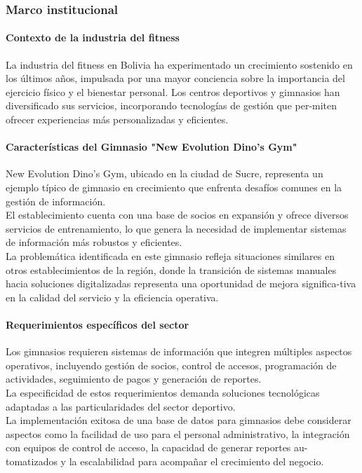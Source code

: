 \documentclass[12pt, letterpaper]{article}
\begin{document}
\subsubsection{Marco institucional}
\paragraph{\textbf{Contexto de la industria del fitness}}
La industria del fitness en Bolivia ha experimentado un crecimiento sostenido en los últimos años, impulsada por una mayor conciencia sobre la importancia del ejercicio físico y el bienestar personal. Los centros deportivos y gimnasios han diversificado sus servicios, incorporando tecnologías de gestión que per-miten ofrecer experiencias más personalizadas y eficientes.
\paragraph{\textbf{Características del Gimnasio "New Evolution Dino's Gym"}}
New Evolution Dino's Gym, ubicado en la ciudad de Sucre, representa un ejemplo típico de gimnasio en crecimiento que enfrenta desafíos comunes en la gestión de información.\\
El establecimiento cuenta con una base de socios en expansión y ofrece diversos servicios de entrenamiento, lo que genera la necesidad de implementar sistemas de información más robustos y eficientes.\\
La problemática identificada en este gimnasio refleja situaciones similares en otros establecimientos de la región, donde la transición de sistemas manuales hacia soluciones digitalizadas representa una oportunidad de mejora significa-tiva en la calidad del servicio y la eficiencia operativa.
\paragraph{\textbf{Requerimientos específicos del sector}}
Los gimnasios requieren sistemas de información que integren múltiples aspectos operativos, incluyendo gestión de socios, control de accesos, programación de actividades, seguimiento de pagos y generación de reportes.\\
La especificidad de estos requerimientos demanda soluciones tecnológicas adaptadas a las particularidades del sector deportivo.\\
La implementación exitosa de una base de datos para gimnasios debe considerar aspectos como la facilidad de uso para el personal administrativo, la integración con equipos de control de acceso, la capacidad de generar reportes au-tomatizados y la escalabilidad para acompañar el crecimiento del negocio.
\newpage
\end{document}
